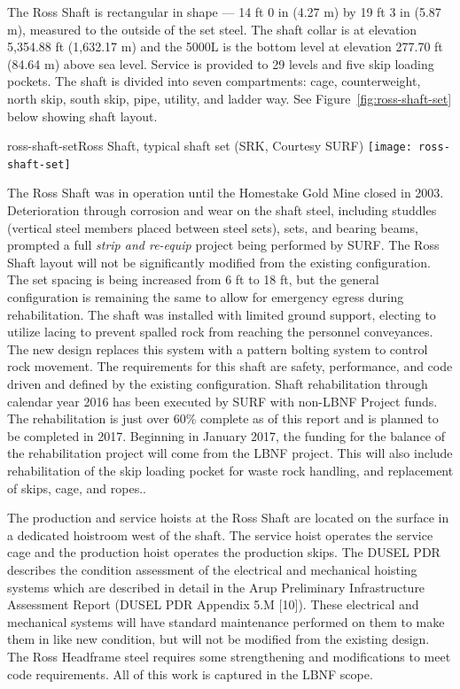 The Ross Shaft is rectangular in shape --- 14 ft 0 in (4.27 m) by 19 ft 3 in (5.87 m), measured to the outside of the set steel. The shaft collar is at elevation 5,354.88 ft (1,632.17 m) and the 5000L is the bottom level at elevation 277.70 ft (84.64 m) above sea level. Service is provided to 29 levels and five skip loading pockets. The shaft is divided into seven compartments: cage, counterweight, north skip, south skip, pipe, utility, and ladder way. See Figure~\ref{fig:ross-shaft-set} below showing shaft layout.


\begin{cdrfigure}{ross-shaft-set}{Ross Shaft, typical shaft set (SRK, Courtesy SURF)}
\texttt{[image: ross-shaft-set]}
\end{cdrfigure}

The Ross Shaft was in operation until the Homestake Gold Mine closed in 2003. Deterioration through corrosion and wear on the shaft steel, including studdles (vertical steel members placed between steel sets), sets, and bearing beams, prompted a full \textit{strip and re-equip} project being performed by  SURF. The Ross Shaft layout will not be significantly modified from the existing configuration. The set spacing is being increased from 6 ft to 18 ft, but the general configuration is remaining the same to allow for emergency egress during rehabilitation. The shaft was installed with limited ground support, electing to utilize lacing to prevent spalled rock from reaching the personnel conveyances. The new design replaces this system with a pattern bolting system to control rock movement. The requirements for this shaft are safety, performance, and code driven and defined by the existing configuration. Shaft rehabilitation through calendar year 2016 has been executed by SURF with non-LBNF Project funds. The rehabilitation is just over 60\% complete as of this report and is planned to be completed in 2017. Beginning in January 2017, the funding for the balance of the rehabilitation project will come from the LBNF project.  This will also include rehabilitation of the skip loading pocket for waste rock handling, and replacement of skips, cage, and ropes..

The production and service hoists at the Ross Shaft are located on the surface in a dedicated hoistroom west of the shaft. The service hoist operates the service cage and the production hoist operates the production skips. The DUSEL PDR describes the condition assessment of the electrical and mechanical hoisting systems which are described in detail in the Arup Preliminary Infrastructure Assessment Report (DUSEL PDR Appendix 5.M [10]). These electrical and mechanical systems will have standard maintenance performed on them to make them in like new condition, but will not be modified from the existing design. The Ross Headframe steel requires some strengthening and modifications to meet code requirements. All of this work is captured in the LBNF scope.


